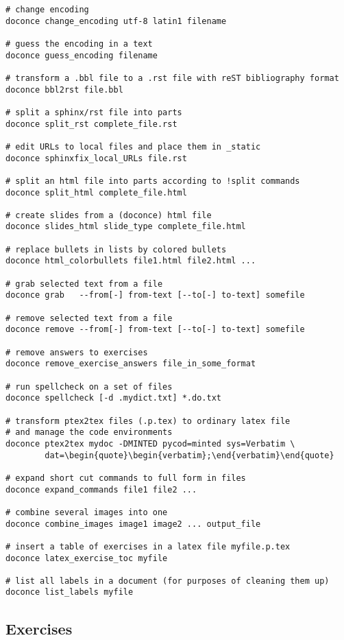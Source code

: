 \documentclass[%
oneside,                 %
final,                   %
10pt]{article}
\begin{document}
\begin{Verbatim}[numbers=none,fontsize=\fontsize{9pt}{9pt},baselinestretch=0.85,xleftmargin=0mm]
# change encoding
doconce change_encoding utf-8 latin1 filename

# guess the encoding in a text
doconce guess_encoding filename

# transform a .bbl file to a .rst file with reST bibliography format
doconce bbl2rst file.bbl

# split a sphinx/rst file into parts
doconce split_rst complete_file.rst

# edit URLs to local files and place them in _static
doconce sphinxfix_local_URLs file.rst

# split an html file into parts according to !split commands
doconce split_html complete_file.html

# create slides from a (doconce) html file
doconce slides_html slide_type complete_file.html

# replace bullets in lists by colored bullets
doconce html_colorbullets file1.html file2.html ...

# grab selected text from a file
doconce grab   --from[-] from-text [--to[-] to-text] somefile

# remove selected text from a file
doconce remove --from[-] from-text [--to[-] to-text] somefile

# remove answers to exercises
doconce remove_exercise_answers file_in_some_format

# run spellcheck on a set of files
doconce spellcheck [-d .mydict.txt] *.do.txt

# transform ptex2tex files (.p.tex) to ordinary latex file
# and manage the code environments
doconce ptex2tex mydoc -DMINTED pycod=minted sys=Verbatim \
        dat=\begin{quote}\begin{verbatim};\end{verbatim}\end{quote}

# expand short cut commands to full form in files
doconce expand_commands file1 file2 ...

# combine several images into one
doconce combine_images image1 image2 ... output_file

# insert a table of exercises in a latex file myfile.p.tex
doconce latex_exercise_toc myfile

# list all labels in a document (for purposes of cleaning them up)
doconce list_labels myfile
\end{Verbatim}

\subsection{Exercises}
\end{document}
